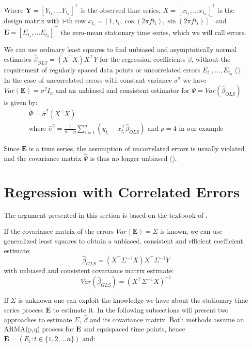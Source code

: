 Where $\mathbf{Y} = [Y_{t_1}, \dots Y_{t_n}]^{\top}$ is the observed time series,
$X = [x_{t_1}, \dots x_{t_n}]^{\top}$ is the design matrix with i-th row
$x_{t_i} = [1, t_i, \cos(2 \pi f t_i), \sin(2 \pi f t_i)]^{\top}$
and $\mathbf{E} = [E_{t_1}, \dots E_{t_n}]^{\top}$ the zero-mean stationary time series,
which we will call errors.

We can use ordinary least squares to find unbiased and asymptotically normal estimates $\hat{\beta}_{OLS} = (X^{\top}X) X^{\top}Y$
for the regression coefficients $\beta$, without the requirement of regularly spaced data points or uncorrelated errors
$E_{t_1}, \dots, E_{t_n}$ (\citeauthor{white_asymptotic_2001}).
In the case of uncorrelated errors with constant variance $\sigma^2$ we have
$Var(\mathbf{E}) = \sigma^2 I_n$ and an unbiased and consistent estimator for $\Psi = Var(\hat{\beta}_{OLS})$ is given by:
\begin{gather*}
\hat{\Psi} = \hat{\sigma}^2(X^{\top}X) \\
    \text{where $\hat{\sigma}^2=\frac{1}{n-p} \sum_{i = 1}^{n} (y_{t_i} - x_{t_i}^{\top} \hat{\beta}_{OLS})$ and $p=4$ in our example}
\end{gather*}

Since $\mathbf{E}$ is a time series, the assumption of uncorrelated errors is usually violated and the
covariance matrix $\hat{\Psi}$ is thus no longer unbiased (\citeauthor{brockwell_introduction_2016}).

\section{Regression with Correlated Errors}

The argument presented in this section is based on the textbook of \citeauthor{brockwell_introduction_2016}.

If the covariance matrix of the errors $Var(\mathbf{E}) = \Sigma$ is known,
we can use generalized least squares to obtain a unbiased, consistent and efficient coefficient estimate:
\[\hat{\beta}_{GLS} = (X^{\top} \Sigma^{-1} X) X^{\top} \Sigma^{-1} Y\]
with unbiased and consistent covariance matrix estimate:
\[Var(\hat{\beta}_{GLS}) = (X^{\top} \Sigma^{-1} X)^{-1}\]

If $\Sigma$ is unknown one can exploit the knowledge we have about the stationary time series process $\mathbf{E}$ to estimate it.
In the following subsections will present two approaches to estimate $\Sigma$, $\hat \beta $ and its covariance matrix.
Both methods assume an ARMA(p,q) process for $\mathbf{E}$ and equispaced time points,
hence $\mathbf{E} = (E_t: t \in \{1, 2, \dots  n \})$ and:


